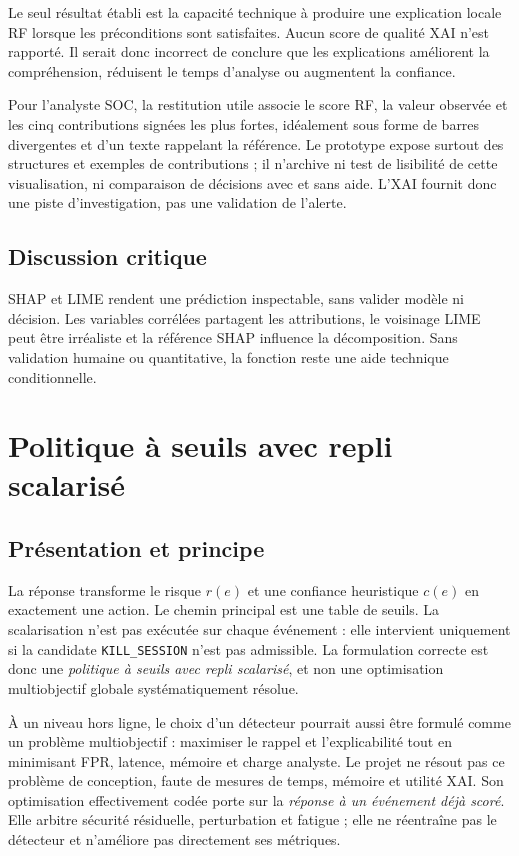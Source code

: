 \documentclass[11pt,a4paper,oneside]{report}
\theoremstyle{definition}
\theoremstyle{plain}
\begin{document}
Le seul résultat établi est la capacité technique à produire une explication locale RF lorsque les préconditions sont satisfaites. Aucun score de qualité XAI n'est rapporté. Il serait donc incorrect de conclure que les explications améliorent la compréhension, réduisent le temps d'analyse ou augmentent la confiance.

Pour l'analyste SOC, la restitution utile associe le score RF, la valeur
observée et les cinq contributions signées les plus fortes, idéalement sous
forme de barres divergentes et d'un texte rappelant la référence. Le prototype
expose surtout des structures et exemples de contributions ; il n'archive ni
test de lisibilité de cette visualisation, ni comparaison de décisions avec et
sans aide. L'XAI fournit donc une piste d'investigation, pas une validation de
l'alerte.

\subsection*{Discussion critique}

SHAP et LIME rendent une prédiction inspectable, sans valider modèle ni décision. Les variables corrélées partagent les attributions, le voisinage LIME peut être irréaliste et la référence SHAP influence la décomposition. Sans validation humaine ou quantitative, la fonction reste une aide technique conditionnelle.

\section{Politique à seuils avec repli scalarisé}
\label{sec:ai-ro-response}

\subsection*{Présentation et principe}

La réponse transforme le risque $r(e)$ et une confiance heuristique $c(e)$ en exactement une action. Le chemin principal est une table de seuils. La scalarisation n'est pas exécutée sur chaque événement : elle intervient uniquement si la candidate \texttt{KILL\_SESSION} n'est pas admissible. La formulation correcte est donc une \emph{politique à seuils avec repli scalarisé}, et non une optimisation multiobjectif globale systématiquement résolue.

À un niveau hors ligne, le choix d'un détecteur pourrait aussi être formulé
comme un problème multiobjectif : maximiser le rappel et l'explicabilité tout
en minimisant FPR, latence, mémoire et charge analyste. Le projet ne résout pas
ce problème de conception, faute de mesures de temps, mémoire et utilité XAI.
Son optimisation effectivement codée porte sur la \emph{réponse à un
événement déjà scoré}. Elle arbitre sécurité résiduelle, perturbation et
fatigue ; elle ne réentraîne pas le détecteur et n'améliore pas directement ses
métriques.
\end{document}
